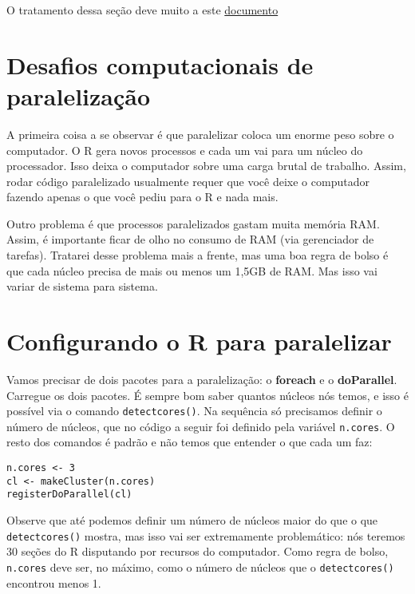 \documentclass[
]{book}
\begin{document}
O tratamento dessa seção deve muito a este \href{http://michaeljkoontz.weebly.com/uploads/1/9/9/4/19940979/parallel.pdf}{documento}

\hypertarget{desafios-computacionais-de-paralelizauxe7uxe3o}{%
\section{Desafios computacionais de paralelização}\label{desafios-computacionais-de-paralelizauxe7uxe3o}}

A primeira coisa a se observar é que paralelizar coloca um enorme peso sobre o computador. O R gera novos processos e cada um vai para um núcleo do processador. Isso deixa o computador sobre uma carga brutal de trabalho. Assim, rodar código paralelizado usualmente requer que você deixe o computador fazendo apenas o que você pediu para o R e nada mais.

Outro problema é que processos paralelizados gastam muita memória RAM. Assim, é importante ficar de olho no consumo de RAM (via gerenciador de tarefas). Tratarei desse problema mais a frente, mas uma boa regra de bolso é que cada núcleo precisa de mais ou menos um 1,5GB de RAM. Mas isso vai variar de sistema para sistema.

\hypertarget{configurando-o-r-para-paralelizar}{%
\section{Configurando o R para paralelizar}\label{configurando-o-r-para-paralelizar}}

Vamos precisar de dois pacotes para a paralelização: o \textbf{foreach} e o \textbf{doParallel}. Carregue os dois pacotes. É sempre bom saber quantos núcleos nós temos, e isso é possível via o comando \texttt{detectcores()}. Na sequência só precisamos definir o número de núcleos, que no código a seguir foi definido pela variável \texttt{n.cores}. O resto dos comandos é padrão e não temos que entender o que cada um faz:

\begin{verbatim}
n.cores <- 3
cl <- makeCluster(n.cores)
registerDoParallel(cl)
\end{verbatim}

Observe que até podemos definir um número de núcleos maior do que o que \texttt{detectcores()} mostra, mas isso vai ser extremamente problemático: nós teremos 30 seções do R disputando por recursos do computador. Como regra de bolso, \texttt{n.cores} deve ser, no máximo, como o número de núcleos que o \texttt{detectcores()} encontrou menos 1.
\end{document}
